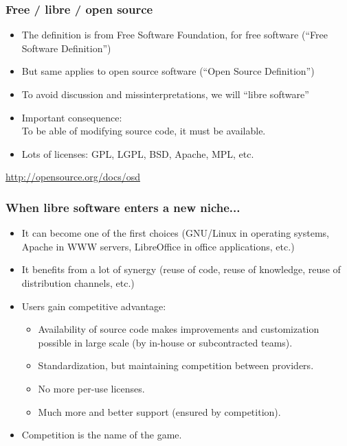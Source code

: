 \documentclass{beamer}
\begin{document}

\begin{frame}
\frametitle{Free / libre / open source}

\begin{itemize}
\item The definition is from Free Software Foundation, for free
  software (``Free Software Definition'')

\item But same applies to open source software (``Open Source Definition'')

\item To avoid discussion and missinterpretations, we will ``libre software''

\item Important consequence: \\
  To be able of modifying source code, it must be available.

\item Lots of licenses: GPL, LGPL, BSD, Apache, MPL, etc.
\end{itemize}

\vspace{.2cm}

\begin{flushright}
\url{http://opensource.org/docs/osd}
\end{flushright}

\end{frame}



\begin{frame}
\frametitle{When libre software enters a new niche...}

\begin{itemize}
\item It can become one of the first choices (GNU/Linux in operating
  systems, Apache in WWW servers, LibreOffice in office applications, etc.)
\item It benefits from a lot of synergy (reuse of code, reuse of
  knowledge, reuse of distribution channels, etc.)
\item Users gain competitive advantage:
  \begin{itemize}
  \item Availability of source code makes improvements and
    customization possible in large scale (by in-house or
    subcontracted teams).
  \item Standardization, but maintaining competition between
    providers.
  \item No more per-use licenses.
  \item Much more and better support (ensured by competition).
  \end{itemize}
\item Competition is the name of the game.
\end{itemize}

\end{frame}
\end{document}
